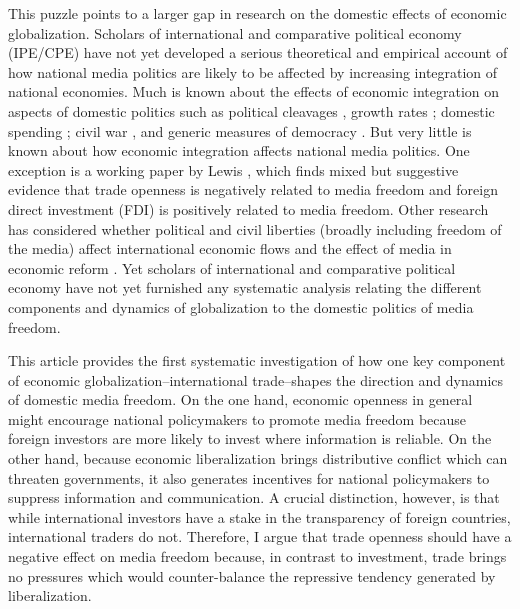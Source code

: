 \documentclass[12pt,a4paper]{article}\usepackage[]{graphicx}\usepackage[]{color}
\begin{document}
This puzzle points to a larger gap in research on the domestic effects of economic globalization. Scholars of international and comparative political economy (IPE/CPE) have not yet developed a serious theoretical and empirical account of how national media politics are likely to be affected by increasing integration of national economies. Much is known about the effects of economic integration on aspects of domestic politics such as political cleavages \parencites{Rogowski:1987ip}{Rogowski:1989wm}{Hiscox:2002us}{hiscox2002international}, growth rates \parencite{Rodriguez:2001uw}; domestic spending \parencites{Rodrik:1998te}{Burgoon:2001dp}; civil war \parencites{Barbieri:2005uk}{Bussmann:2007vx}, and generic measures of democracy \parencites{EICHENGREEN:2008gg}{Li:2003vj}. But very little is known about how economic integration affects national media politics. One exception is a working paper by Lewis \parencite*{Lewis:qDvYbWlU}, which finds mixed but suggestive evidence that trade openness is negatively related to media freedom and foreign direct investment (FDI) is positively related to media freedom. Other research has considered whether political and civil liberties (broadly including freedom of the media) affect international economic flows \parencite{Adam:2007gn} and the effect of media in economic reform \parencites{Coyne:2004bq}{Islam:2002uc}. Yet scholars of international and comparative political economy have not yet furnished any systematic analysis relating the different components and dynamics of globalization to the domestic politics of media freedom.

This article provides the first systematic investigation of how one key component of economic globalization--international trade--shapes the direction and dynamics of domestic media freedom. On the one hand, economic openness in general might encourage national policymakers to promote media freedom because foreign investors are more likely to invest where information is reliable. On the other hand, because economic liberalization brings distributive conflict which can threaten governments, it also generates incentives for national policymakers to suppress information and communication. A crucial distinction, however, is that while international investors have a stake in the transparency of foreign countries, international traders do not. Therefore, I argue that trade openness should have a negative effect on media freedom because, in contrast to investment, trade brings no pressures which would counter-balance the repressive tendency generated by liberalization.
\end{document}

